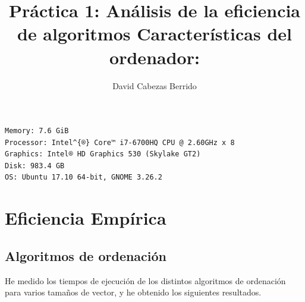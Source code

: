 \documentclass[a4]{article}
\author{David Cabezas Berrido}
\date{\vspace{-5mm}}
\title{\huge Práctica 1: Análisis de la eficiencia de algoritmos \HRule\vspace{-4mm}}
\begin{document}
\maketitle

\tableofcontents

\vfill

\title{\large \textbf{Características del ordenador:}}
\begin{verbatim}
Memory: 7.6 GiB
Processor: Intel^{®} Core™ i7-6700HQ CPU @ 2.60GHz x 8
Graphics: Intel® HD Graphics 530 (Skylake GT2)
Disk: 983.4 GB
OS: Ubuntu 17.10 64-bit, GNOME 3.26.2
\end{verbatim}

\newpage
\section{Eficiencia Empírica}

\subsection{Algoritmos de ordenación}

\begin{flushleft}
  He medido los tiempos de ejecución de los distintos algoritmos de
  ordenación para varios tamaños de vector, y he obtenido los
  siguientes resultados.
\end{flushleft}
\end{document}

